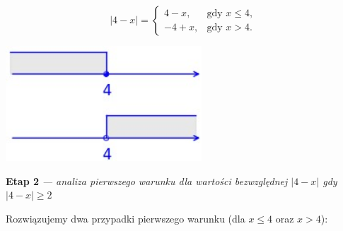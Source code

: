 \documentclass[12pt, a4paper]{report}
\begin{document}
    \begin{center}                           %
    \begin{minipage}[c]{0.3\textwidth}       %
    \vspace*{\fill}                          %
    \[
        |4-x| = \begin{cases}
                    4-x, & \text{gdy } x \leq 4, \\
                    -4+x, & \text{gdy } x > 4.
        \end{cases}
    \]
    \vspace*{\fill}                          %
    \end{minipage}
    \hspace{0.05cm}                          %
    \begin{minipage}[c]{0.4\textwidth}       %
        \centering
        \hspace{0.3cm}                       %
        \includegraphics[width=0.55\textwidth]{fig_1.jpg}   %
        \vspace*{\fill}                      %
    \end{minipage}
    \end{center}

    \vspace{10pt}                            %

    \noindent
    \textbf{Etap 2}
    \emph{ --- analiza pierwszego warunku dla wartości bezwzględnej $|4-x|$ gdy $|4 - x| \geq 2$}

    \noindent
    Rozwiązujemy dwa przypadki pierwszego warunku (dla $x \leq 4$ oraz $x > 4$):
    \noindent
    \vspace{10pt}                            %
\end{document}
